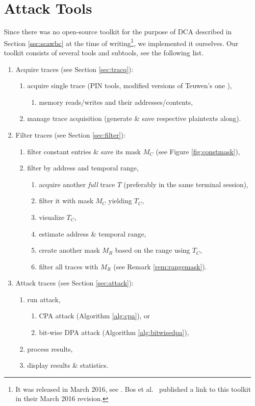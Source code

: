 \section{Attack Tools}
\label{sec:tools}

Since there was no open-source toolkit for the purpose of DCA described in Section \ref{sec:scawbc} at the time of writing\footnote{It was released in March 2016, see \cite{bos2016tools}. Bos et al.\ \cite{bos2015differential} published a link to this toolkit in their March 2016 revision.}, we implemented it ourselves. Our toolkit consists of several tools and subtools, see the following list.

\begin{enumerate}
	\item Acquire traces (see Section \ref{sec:tracq}):
	\begin{enumerate}
		\item acquire single trace (PIN tools, modified versions of Teuwen's one \cite{teuwen2015movfuscator}),
		\begin{enumerate}
			\item memory reads/writes and their addresses/contents,
		\end{enumerate}
		\item manage trace acquisition (generate \& save respective plaintexts along).
	\end{enumerate}
	\item Filter traces (see Section \ref{sec:filter}):
	\begin{enumerate}
		\item filter constant entries \& save its mask $M_C$ (see Figure \ref{fig:constmask}),
		\item filter by address and temporal range,
		\begin{enumerate}
			\item acquire another {\em full} trace $T$ (preferably in the same terminal session),
			\item filter it with mask $M_C$ yielding $T_C$,
			\item visualize $T_C$,
			\item estimate address \& temporal range,
			\item create another mask $M_R$ based on the range using $T_C$,
			\item filter all traces with $M_R$ (see Remark \ref{rem:rangemask}).
		\end{enumerate}
	\end{enumerate}
	\item Attack traces (see Section \ref{sec:attack}):
	\begin{enumerate}
		\item run attack,
		\begin{enumerate}
			\item CPA attack (Algorithm \ref{alg:cpa}), or
			\item bit-wise DPA attack (Algorithm \ref{alg:bitwisedpa}),
		\end{enumerate}
		\item process results,
		\item display results \& statistics.
	\end{enumerate}
\end{enumerate}
